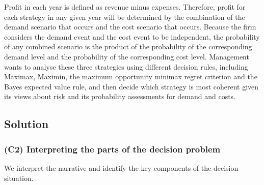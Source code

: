 	\medskip
	Profit in each year is defined as revenue minus expenses. Therefore, profit for each strategy in any given year will
	be determined by the combination of the demand scenario that occurs and the cost scenario that occurs. Because the
	firm considers the demand event and the cost event to be independent, the probability of any combined scenario is
	the product of the probability of the corresponding demand level and the probability of the corresponding cost
	level. Management wants to analyse these three strategies using different decision rules, including Maximax, Maximin,
	the maximum opportunity minimax regret criterion and the Bayes expected value rule, and then decide which strategy
	is most coherent given its views about risk and its probability assessments for demand and costs.
	
	\subsection{Solution}\label{subsec:example2-solution}
	
	\subsubsection{(C2) Interpreting the parts of the decision problem}\label{subsubsec:example2-c2}
	
	We interpret the narrative and identify the key components of the decision situation.
	
